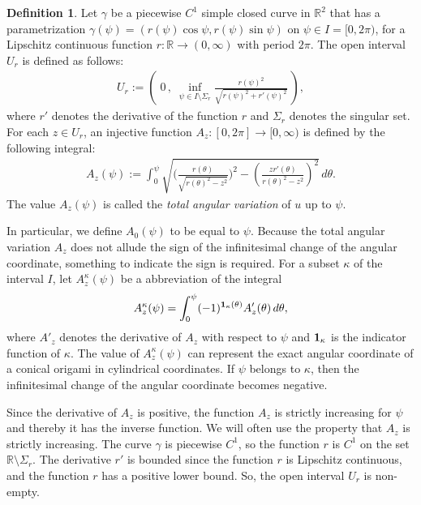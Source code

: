\documentclass{amsart}
\theoremstyle{plain}
\theoremstyle{definition}
\newtheorem*{definition}{Definition}
\theoremstyle{remark}
\begin{document}
\begin{definition}%
Let $\gamma$ be a piecewise $C^1$ simple closed curve in $\mathbb{R}^2$ that has a parametrization $\gamma(\psi)=(r(\psi)\cos\psi,r(\psi)\sin\psi)$ on $\psi\in I=[0,2\pi)$, for a Lipschitz continuous function $r \colon \mathbb{R}\to(0,\infty)$ with period $2\pi$.
The open interval $U_r$ is defined as follows:
\begin{align*}
U_r:=\left(\;0\,,\;\inf_{\psi\in I\setminus\Sigma_r}\frac{r(\psi)^2}{\sqrt{r(\psi)^2+r'(\psi)^2}}\,\right),
\end{align*}
where $r'$ denotes the derivative of the function $r$ and $\Sigma_r$ denotes the singular set.
For each $z\in U_r$, an injective function  $A_z \colon [0,2\pi]\to[0,\infty)$ is defined by the following integral:
\begin{align*}
A_z(\psi):=\int_0^{\psi}\sqrt{\biggl(\frac{r(\theta)}{\sqrt{r(\theta)^2-z^2}}\biggr)^2-\left(\frac{zr'(\theta)}{r(\theta)^2-z^2}\right)^2}\,d\theta.
\end{align*}
The value $A_z(\psi)$ is called the \emph{total angular variation} of $u$ up to $\psi$.
\end{definition}


In particular, we define $A_0(\psi)$ to be equal to $\psi$.
Because the total angular variation $A_z$ does not allude the sign of the infinitesimal change of the angular coordinate, something to indicate the sign is required.
For a subset $\kappa$ of the interval $I$, let $A_z^{\kappa}(\psi)$ be a abbreviation of the integral
\begin{align*}
A_z^{\kappa}(\psi)=\int_0^{\psi}(-1)^{\bold{1}_{\kappa}(\theta)}A'_z(\theta)\,d\theta,
\end{align*}
where $A'_z$ denotes the derivative of $A_z$ with respect to $\psi$ and $\bold{1}_{\kappa}$ is the indicator function of $\kappa$.
The value of $A_z^{\kappa}(\psi)$ can represent the exact angular coordinate of a conical origami in cylindrical coordinates.
If $\psi$ belongs to $\kappa$, then the infinitesimal change of the angular coordinate becomes negative. 

Since the derivative of $A_z$ is positive, the function $A_z$ is strictly increasing for $\psi$ and thereby it has the inverse function.
We will often use the property that $A_z$ is strictly increasing.
The curve $\gamma$ is piecewise $C^1$, so the function $r$ is $C^1$ on the set $\mathbb{R}\setminus\Sigma_r$.
The derivative $r'$ is bounded since the function $r$ is Lipschitz continuous, and the function $r$ has a positive lower bound.
So, the open interval $U_r$ is non-empty.
\end{document}
